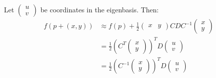 \documentclass[a4paper, 12pt]{article}
\begin{document}
\begin{solution}
    Let $\begin{pmatrix}
            u \\
            v
        \end{pmatrix}$ be coordinates in the eigenbasis. Then:
    \begin{align*}
        f(p+(x, y)) & \approx f(p) + \frac{1}{2}\begin{pmatrix}
                                                    x & y
                                                \end{pmatrix} C D C^{-1} \begin{pmatrix}
                                                                             x \\
                                                                             y
                                                                         \end{pmatrix}                                       \\
                    & = \frac{1}{2} \left(C^T \begin{pmatrix}
                                                      x \\
                                                      y
                                                  \end{pmatrix}\right)^T D \begin{pmatrix}
                                                                           u \\
                                                                           v
                                                                       \end{pmatrix}                                         \\
                    & = \frac{1}{2} \left(C^{-1} \begin{pmatrix}
                                                     x \\
                                                     y
                                                 \end{pmatrix}\right)^T D \begin{pmatrix}
                                                                              u \\
                                                                              v
                                                                          \end{pmatrix}                                      \\

\end{align*}
\end{solution}
\end{document}
